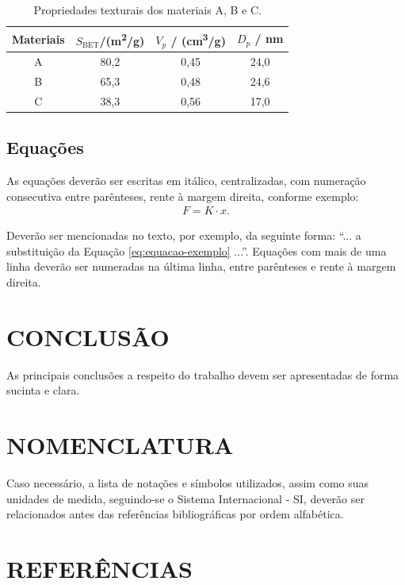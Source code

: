 \documentclass[12pt,a4paper]{article}
\begin{document}
\begin{table}[htb]
    \centering
    \caption{Propriedades texturais dos materiais A, B e C.}
    \label{tab:tabela-exemplo}
    \begin{tabular}{cccc}\hline
         Materiais & $S_{\text{BET}}$/(m\textsuperscript{2}/g) & $V_{p}$ / (cm\textsuperscript{3}/g) & $D_{p}$ / nm  \\\hline
         A & 80,2 & 0,45 & 24,0\\
         B & 65,3 & 0,48 & 24,6 \\
         C & 38,3 & 0,56 & 17,0\\\hline
    \end{tabular}
\end{table}

\subsection{Equações}

As equações deverão ser escritas em itálico, centralizadas, com numeração consecutiva entre parênteses, rente à margem direita, conforme exemplo:
\begin{align}
    F = K\cdot x. \label{eq:equacao-exemplo}
\end{align}

Deverão ser mencionadas no texto, por exemplo, da seguinte forma: ``... a substituição da Equação \eqref{eq:equacao-exemplo} ...''. Equações com mais de uma linha deverão ser numeradas na última linha, entre parênteses e rente à margem direita.

\section{CONCLUSÃO}

As principais conclusões a respeito do trabalho devem ser apresentadas de forma sucinta e clara.

\section{NOMENCLATURA}

Caso necessário, a lista de notações e símbolos utilizados, assim como suas unidades de medida, seguindo-se o Sistema Internacional - SI, deverão ser relacionados antes das referências bibliográficas por ordem alfabética.

\section{REFERÊNCIAS}
\end{document}
